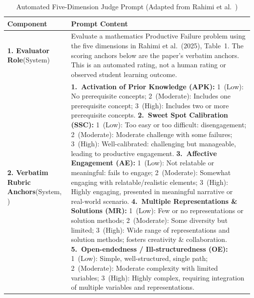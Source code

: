 {\begin{table}[!htbp]
\centering
\vspace{-0.4em}
\caption[Automated Five-Dimension Judge Prompt (Adapted from Rahimi et al.)]{Automated Five-Dimension Judge Prompt (Adapted from Rahimi et al.~\cite{rahimi2025})}
\label{tab:app-oneshot-judge}
\vspace{0.1em}
{\fontsize{7.5}{8.8}\selectfont
\setlength{\tabcolsep}{4pt}
\renewcommand{\arraystretch}{1.06}
\begin{tabular}{@{} >{\raggedright\arraybackslash}p{} >{\raggedright\arraybackslash}p{} @{}}
\toprule
\textbf{Component} & \textbf{Prompt Content} \\
\midrule
\textbf{1. Evaluator Role}\newline (System) &
Evaluate a mathematics Productive Failure problem using the five dimensions in Rahimi et al.\ (2025), Table~1. The scoring anchors below are the paper's verbatim anchors. This is an automated rating, not a human rating or observed student learning outcome. \\
\midrule
\textbf{2. Verbatim Rubric Anchors}\newline (System, \cite{rahimi2025}) &
\textbf{1.~Activation of Prior Knowledge (APK):} 1~(Low): No prerequisite concepts; 2~(Moderate): Includes one prerequisite concept; 3~(High): Includes two or more prerequisite concepts.\newline
\textbf{2.~Sweet Spot Calibration (SSC):} 1~(Low): Too easy or too difficult: disengagement; 2~(Moderate): Moderate challenge with some failures; 3~(High): Well-calibrated: challenging but manageable, leading to productive engagement.\newline
\textbf{3.~Affective Engagement (AE):} 1~(Low): Not relatable or meaningful: fails to engage; 2~(Moderate): Somewhat engaging with relatable/realistic elements; 3~(High): Highly engaging, presented in meaningful narrative or real-world scenario.\newline
\textbf{4.~Multiple Representations \& Solutions (MR):} 1~(Low): Few or no representations or solution methods; 2~(Moderate): Some diversity but limited; 3~(High): Wide range of representations and solution methods; fosters creativity \& collaboration.\newline
\textbf{5.~Open-endedness / Ill-structuredness (OE):} 1~(Low): Simple, well-structured, single path; 2~(Moderate): Moderate complexity with limited variables; 3~(High): Highly complex, requiring integration of multiple variables and representations. \\

\end{tabular}}
\end{table}}
